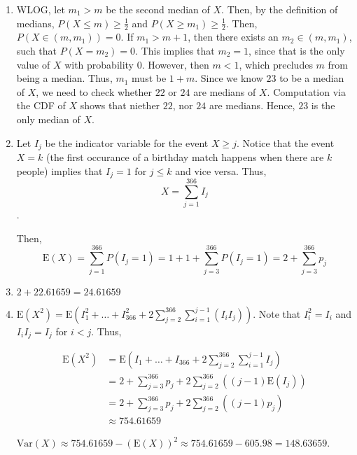 \begin{enumerate}[label=(\alph*)]
\item WLOG, let $m_{1} > m$
be the second median of $X$. Then, by the
definition of medians, $P(X \leq m) \geq \frac{1}{2}$ and $P(X \geq m_{1}) \geq 
\frac{1}{2}$. Then, $P(X \in (m,m_{1})) = 0$. If $m_{1} > m + 1$, then
there exists an $m_{2} \in (m, m_{1})$, such that $P(X = m_{2}) = 0$. This
implies that $m_{2} = 1$, since that is the only value of $X$ with
probability $0$. However, then $m < 1$, which precludes $m$ from being a
median. Thus, $m_{1}$ must be $1 + m$. Since we know $23$ to be a median of $X$,
we need to check whether $22$ or $24$ are medians of $X$. Computation via the
CDF of $X$ shows that niether $22$, nor $24$ are medians. Hence, $23$ is the
only median of $X$.

\item Let $I_{j}$ be the indicator variable for the event $X \geq j$. Notice
that the event $X = k$ (the first occurance of a birthday match happens when
there are $k$ people) implies that $I_{j}=1$ for $j \leq k$ and vice versa.
Thus, $$X = \sum_{j=1}^{366}I_{j}$$. 

Then, $$\text{E}(X) = \sum_{j=1}^{366}P(I_{j}=1) = 1 + 1 + \sum_{j=3}^{366}P(I_
{j}=1) = 2 + \sum_{j=3}^{366}p_{j}$$

\item $2 + 22.61659 = 24.61659$

\item $\text{E}(X^{2}) =
\text{E}(I_{1}^{2} + \dots + I_{366}^{2} + 2\sum_{j=2}^
{366}\sum_{i=1}^{j-1}(I_{i}I_{j}))$. Note that $I_{i}^{2} = I_{i}$ and $I_{i}I_
{j} = I_{j}$ for $i < j$. Thus,

\begin{align*}
\text{E}(X^{2}) &= \text{E}(I_{1} + \dots + I_{366} + 2\sum_{j=2}^
{366}\sum_{i=1}^{j-1}I_{j}) \\
&= 2 + \sum_{j=3}^{366}p_{j} + 2\sum_{j=2}^{366}((j-1)\text{E}(I_{j})) \\
&= 2 + \sum_{j=3}^{366}p_{j} + 2\sum_{j=2}^{366}((j-1)p_{j}) \\
&\approx 754.61659
\end{align*}

$\text{Var}(X) \approx 754.61659 - (\text{E}(X))^{2} \approx 754.61659 - 605.98 =
148.63659$.
\end{enumerate}